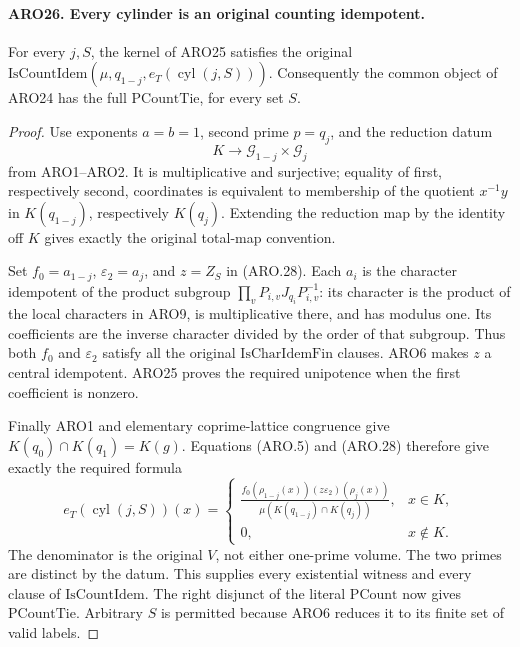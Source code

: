 \paragraph{ARO26. Every cylinder is an original counting idempotent.}
\label{claim:ARO26}
For every \(j,S\), the kernel of ARO25 satisfies the original
\(\mathrm{IsCountIdem}(\mu,q_{1-j},e_T(\operatorname{cyl}(j,S)))\).
Consequently the common object of ARO24 has the full
\(\mathrm{PCountTie}\), for every set \(S\).
\begin{proof}
Use exponents \(a=b=1\), second prime \(p=q_j\), and the
reduction datum
\[
 K\longrightarrow\mathcal G_{1-j}\times\mathcal G_j
\]
from ARO1--ARO2.  It is multiplicative and surjective; equality
of first, respectively second, coordinates is equivalent to
membership of the quotient \(x^{-1}y\) in \(K(q_{1-j})\),
respectively \(K(q_j)\).  Extending the reduction map by the
identity off \(K\) gives exactly the original total-map convention.

Set \(f_0=a_{1-j}\), \(\varepsilon_2=a_j\), and \(z=Z_S\)
in (ARO.28).  Each \(a_i\) is the character idempotent of the
product subgroup \(\prod_vP_{i,v}J_{q_i}P_{i,v}^{-1}\): its
character is the product of the local characters in ARO9, is
multiplicative there, and has modulus one.  Its coefficients are
the inverse character divided by the order of that subgroup.
Thus both \(f_0\) and \(\varepsilon_2\) satisfy all the original
\(\mathrm{IsCharIdemFin}\) clauses.  ARO6 makes \(z\) a central
idempotent.  ARO25 proves the required unipotence when the first
coefficient is nonzero.

Finally ARO1 and elementary coprime-lattice congruence give
\(K(q_0)\cap K(q_1)=K(g)\).  Equations (ARO.5) and (ARO.28)
therefore give exactly the required formula
\[
 e_T(\operatorname{cyl}(j,S))(x)=
 \begin{cases}
 \displaystyle\frac{f_0(\rho_{1-j}(x))
                 (z\varepsilon_2)(\rho_j(x))}
                 {\mu(K(q_{1-j})\cap K(q_j))},&x\in K,\\[6pt]
 0,&x\notin K.
 \end{cases}                                         \tag{ARO.29}
\]
The denominator is the original \(V\), not either one-prime
volume.  The two primes are distinct by the datum.  This supplies
every existential witness and every clause of
\(\mathrm{IsCountIdem}\).  The right disjunct of the literal
\(\mathrm{PCount}\) now gives \(\mathrm{PCountTie}\).
Arbitrary \(S\) is permitted because ARO6 reduces it to its
finite set of valid labels.
\end{proof}

